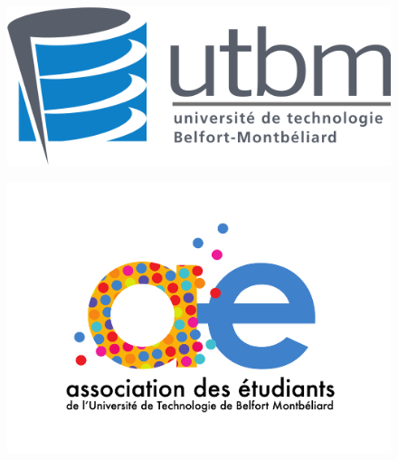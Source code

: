 
\thispagestyle{empty}
    \begin{sffamily}
        \begin{center}






            \begin{figure}[htbp]
                \centering
                \begin{minipage}[c]{0.45\textwidth}
                    \centering
                    \includegraphics[width=\textwidth]{ressources/logo}
                    \label{fig:image1}
                \end{minipage}
                \hfill
                \begin{minipage}[c]{0.45\textwidth}
                    \centering
                    \includegraphics[width=\textwidth]{ressources/AE couleur}
                    \label{fig:image2}
                \end{minipage}
            \end{figure}


\end{center}
\end{sffamily}
